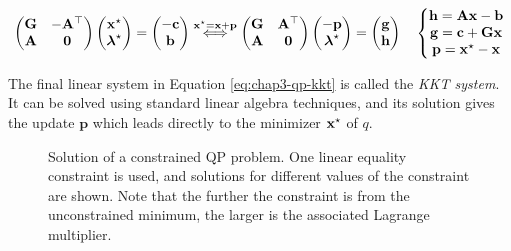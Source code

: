 \begin{equation}
  \label{eq:chap3-qp-kkt}
  \left(\begin{matrix}
    \mathbf{G} & -\mathbf{A}^{\top} \\
    \mathbf{A} & \mathbf{0}
  \end{matrix}\right)
  \left(\begin{matrix}
    \mathbf{x}^{\star} \\
    \boldsymbol{\lambda}^{\star}
  \end{matrix}\right)
  = \left(\begin{matrix}
    -\mathbf{c} \\
    \mathbf{b}
  \end{matrix}\right)  
  \overset{\mathbf{x}^{\star}=\mathbf{x}+\mathbf{p}}\Longleftrightarrow
  \left(\begin{matrix}
    \mathbf{G} & \mathbf{A}^{\top} \\
    \mathbf{A} & \mathbf{0} \\
  \end{matrix}\right)
  \left(\begin{matrix}
    -\mathbf{p} \\
    \boldsymbol{\lambda}^{\star}
  \end{matrix}\right)
  = \left(\begin{matrix}
    \mathbf{g} \\
    \mathbf{h}
  \end{matrix}\right)
  \quad
  \left\{\begin{matrix}
      \mathbf{h} = \mathbf{A}\mathbf{x} - \mathbf{b} \\
      \mathbf{g} = \mathbf{c} + \mathbf{G}\mathbf{x} \\
      \mathbf{p} = \mathbf{x}^{\star} - \mathbf{x}
    \end{matrix}\right.
\end{equation}

The final linear system in Equation \ref{eq:chap3-qp-kkt} is called
the \emph{KKT system}. It can be solved using standard linear algebra
techniques, and its solution gives the update $\mathbf{p}$ which leads
directly to the minimizer $\mathbf{x}^{\star}$ of $q$.

\begin{figure}
      \caption{Solution of a constrained QP problem. One linear
        equality constraint is used, and solutions for different
        values of the constraint are shown. Note that the further the
        constraint is from the unconstrained minimum, the larger is
        the associated Lagrange multiplier.}
      \label{fig:chap3-qp-equality}
\end{figure}

